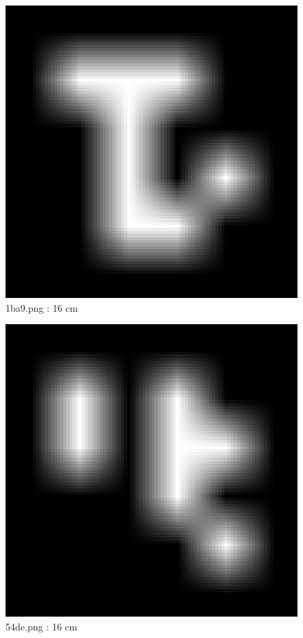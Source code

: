 \documentclass[11pt,a4,BCOR=0cm]{scrartcl}
\begin{document}
\newpage
\begin{figure}
  \begin{center}
    \includegraphics[natwidth=6,natheight=6,width=16cm]{1ba9.png}
    \caption{1ba9.png : 16 cm}
    \label{fig:1ba9.png}
  \end{center}
\end{figure}
\newpage
\begin{figure}
  \begin{center}
    \includegraphics[natwidth=6,natheight=6,width=16cm]{54de.png}
    \caption{54de.png : 16 cm}
    \label{fig:54de.png}
  \end{center}
\end{figure}
\end{document}
